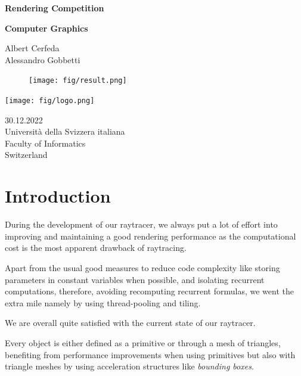 \documentclass[tikz,14pt,fleqn]{article}
\newcommand\namesurname{Albert Cerfeda\\Alessandro Gobbetti}
\newcommand\assignment{Assignment 9}
\newcommand\subject{Computer Graphics}
\newcommand\documentdate{30.12.2022}
\begin{document}
\begin{titlepage}
   \begin{center}
       \vspace*{0.2cm}

       \textbf{\Large{Rendering Competition}}

       \vspace{0.5cm}
        \textbf{\subject}\\[5mm]
        
            
       \vspace{0.4cm}

        \namesurname
        \begin{figure}[H]
            \centering
            \texttt{[image: fig/result.png]}
        \end{figure}
       \tableofcontents

       \vspace*{\fill}
     
        \texttt{[image: fig/logo.png]}
       
        \documentdate \\
        Università della Svizzera italiana\\
        Faculty of Informatics\\
        Switzerland\\

   \end{center}
\end{titlepage}



\section{Introduction}
During the development of our raytracer, we always put a lot of effort into improving and maintaining a good rendering performance as the computational cost is the most apparent drawback of raytracing.

Apart from the usual good measures to reduce code complexity like storing parameters in constant variables when possible, and isolating recurrent computations, therefore, avoiding recomputing recurrent formulas, we went the extra mile namely by using thread-pooling and tiling.

We are overall quite satisfied with the current state of our raytracer.

Every object is either defined as a primitive or through a mesh of triangles, benefiting from performance improvements when using primitives but also with triangle meshes by using acceleration structures like \textit{bounding boxes}.
\end{document}
